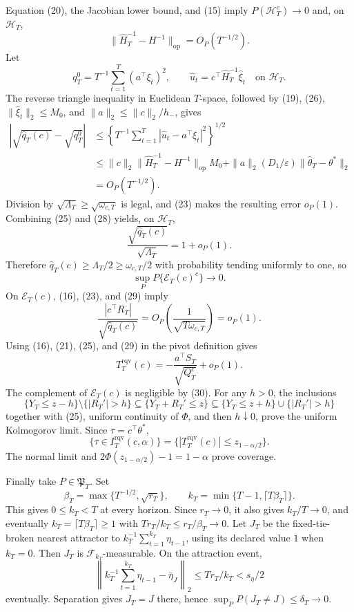 Equation (20), the Jacobian lower bound, and (15) imply \(P(\mathcal H_T^c)\to0\) and, on \(\mathcal H_T\),
\[
 \|\widehat H_T^{-1}-H^{-1}\|_{\mathrm{op}}=O_P(T^{-1/2}).
\tag{26}
\]
Let
\[
 q_T^0=T^{-1}\sum_{t=1}^T(a^\top\xi_t)^2,
 \qquad
 \widehat u_t=c^\top\widehat H_T^{-1}\widehat\xi_t
 \quad\text{on }\mathcal H_T.
\tag{27}
\]
The reverse triangle inequality in Euclidean \(T\)-space, followed by (19), (26), \(\|\widehat\xi_t\|_2\le M_0\), and \(\|a\|_2\le\|c\|_2/h_-\), gives
\[
\begin{aligned}
 \left|\sqrt{\widehat q_T(c)}-\sqrt{q_T^0}\right|
 &\le\left\{T^{-1}\sum_{t=1}^T
 |\widehat u_t-a^\top\xi_t|^2\right\}^{1/2}\\
 &\le \|c\|_2\|\widehat H_T^{-1}-H^{-1}\|_{\mathrm{op}}M_0
 +\|a\|_2(D_1/\varepsilon)\|\widehat\theta_T-\theta^*\|_2\\
 &=O_P(T^{-1/2}).
\end{aligned}
\tag{28}
\]
Division by \(\sqrt{\Lambda_T}\ge\sqrt{\omega_{c,T}}\) is legal, and (23) makes the resulting error \(o_P(1)\). Combining (25) and (28) yields, on \(\mathcal H_T\),
\[
 \frac{\sqrt{\widehat q_T(c)}}{\sqrt{\Lambda_T}}=1+o_P(1).
\tag{29}
\]
Therefore \(\widehat q_T(c)\ge\Lambda_T/2\ge\omega_{c,T}/2\) with probability tending uniformly to one, so
\[
 \sup_P P\{\mathcal E_T(c)^c\}\longrightarrow0.
\tag{30}
\]
On \(\mathcal E_T(c)\), (16), (23), and (29) imply
\[
 \frac{|c^\top R_T|}{\sqrt{\widehat q_T(c)}}
 =O_P\!\left(\frac1{\sqrt{T\omega_{c,T}}}\right)=o_P(1).
\tag{31}
\]
Using (16), (21), (25), and (29) in the pivot definition gives
\[
 T_T^{\mathrm{rqv}}(c)
 =-\frac{a^\top S_T}{\sqrt{Q_T^c}}+o_P(1).
\tag{32}
\]
The complement of \(\mathcal E_T(c)\) is negligible by (30). For any \(h>0\), the inclusions
\[
 \{Y_T\le z-h\}\setminus\{|R_T'|>h\}
 \subseteq\{Y_T+R_T'\le z\}
 \subseteq\{Y_T\le z+h\}\cup\{|R_T'|>h\}
\tag{33}
\]
together with (25), uniform continuity of \(\Phi\), and then \(h\downarrow0\), prove the uniform Kolmogorov limit. Since \(\tau=c^\top\theta^*\),
\[
 \{\tau\in I_T^{\mathrm{rqv}}(c,\alpha)\}
 =\{|T_T^{\mathrm{rqv}}(c)|\le z_{1-\alpha/2}\}.
\tag{34}
\]
The normal limit and \(2\Phi(z_{1-\alpha/2})-1=1-\alpha\) prove coverage.

Finally take \(P\in\mathfrak P_T\). Set
\[
 \beta_T=\max\{T^{-1/2},\sqrt{r_T}\},\qquad
 k_T=\min\{T-1,\lceil T\beta_T\rceil\}.
\tag{35}
\]
This gives \(0\le k_T<T\) at every horizon. Since \(r_T\to0\), it also gives \(k_T/T\to0\), and eventually \(k_T=\lceil T\beta_T\rceil\ge1\) with \(Tr_T/k_T\le r_T/\beta_T\to0\). Let \(J_T\) be the fixed-tie-broken nearest attractor to \(k_T^{-1}\sum_{t=1}^{k_T}\eta_{t-1}\), using its declared value \(1\) when \(k_T=0\). Then \(J_T\) is \(\mathcal F_{k_T}\)-measurable. On the attraction event,
\[
 \left\|k_T^{-1}\sum_{t=1}^{k_T}\eta_{t-1}-\bar\eta_J\right\|_2
 \le Tr_T/k_T<s_\eta/2
\tag{36}
\]
eventually. Separation gives \(J_T=J\) there, hence \(\sup_PP(J_T\ne J)\le\delta_T\to0\).

